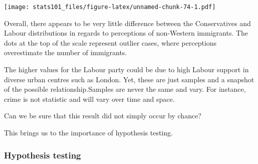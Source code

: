 \documentclass[]{article}
\newenvironment{Shaded}{\begin{snugshade}}{\end{snugshade}}
\newcommand{\CommentTok}[1]{\textcolor[rgb]{0.56,0.35,0.01}{\textit{#1}}}
\newcommand{\DataTypeTok}[1]{\textcolor[rgb]{0.13,0.29,0.53}{#1}}
\newcommand{\DecValTok}[1]{\textcolor[rgb]{0.00,0.00,0.81}{#1}}
\newcommand{\KeywordTok}[1]{\textcolor[rgb]{0.13,0.29,0.53}{\textbf{#1}}}
\newcommand{\NormalTok}[1]{#1}
\newcommand{\OperatorTok}[1]{\textcolor[rgb]{0.81,0.36,0.00}{\textbf{#1}}}
\newcommand{\OtherTok}[1]{\textcolor[rgb]{0.56,0.35,0.01}{#1}}
\newcommand{\StringTok}[1]{\textcolor[rgb]{0.31,0.60,0.02}{#1}}
\begin{document}
\begin{Shaded}
\end{Shaded}

\texttt{[image: stats101\_files/figure-latex/unnamed-chunk-74-1.pdf]}

Overall, there appears to be very little difference between the Conservatives and Labour distributions in regards to perceptions of non-Western immigrants. The dots at the top of the scale represent outlier cases, where perceptions overestimate the number of immigrants.

The higher values for the Labour party could be due to high Labour support in diverse urban centres such as London. Yet, these are just samples and a snapshot of the possible relationship.Samples are never the same and vary. For instance, crime is not statistic and will vary over time and space.

Can we be sure that this result did not simply occur by chance?

This brings us to the importance of hypothesis testing.

\hypertarget{hypothesis-testing}{%
\subsubsection{Hypothesis testing}\label{hypothesis-testing}}
\end{document}
